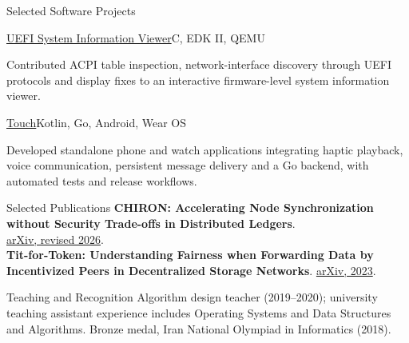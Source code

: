 \documentclass[11pt]{resume}
\begin{document}
\begin{rSection}{Selected Software Projects}
\begin{rSubsection}{\href{https://github.com/Arman17Babaei/UEFI-System-Information-Viewer}{UEFI System Information Viewer}}{}{C, EDK II, QEMU}{}
\item Contributed ACPI table inspection, network-interface discovery through UEFI protocols and display fixes to an interactive firmware-level system information viewer.
\end{rSubsection}
\begin{rSubsection}{\href{https://github.com/Arman17Babaei/touch-app}{Touch}}{}{Kotlin, Go, Android, Wear OS}{}
\item Developed standalone phone and watch applications integrating haptic playback, voice communication, persistent message delivery and a Go backend, with automated tests and release workflows.
\end{rSubsection}
\end{rSection}

\begin{rSection}{Selected Publications}
\textbf{CHIRON: Accelerating Node Synchronization without Security Trade-offs in Distributed Ledgers}.\\
\href{https://arxiv.org/abs/2401.14278}{arXiv, revised 2026}.\\[5pt]
\textbf{Tit-for-Token: Understanding Fairness when Forwarding Data by Incentivized Peers in Decentralized Storage Networks}. \href{https://arxiv.org/abs/2307.02231}{arXiv, 2023}.
\end{rSection}

\begin{rSection}{Teaching and Recognition}
Algorithm design teacher (2019--2020); university teaching assistant experience includes Operating Systems and Data Structures and Algorithms. Bronze medal, Iran National Olympiad in Informatics (2018).
\end{rSection}
\end{document}
